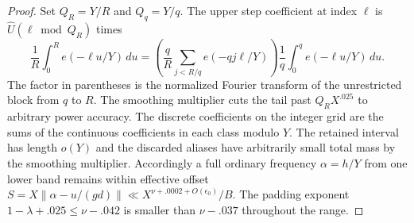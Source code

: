 \documentclass[11pt,a4paper]{article}
\theoremstyle{paperplain}
\numberwithin{equation}{section}
\begin{document}
\begin{proof}
Set $Q_R=Y/R$ and $Q_q=Y/q$. The upper step coefficient at
index $\ell$ is $\widehat U(\ell\bmod Q_R)$ times
\begin{equation}\label{eq:near-balanced-sinc-block}
 \frac1R\int_0^R e(-\ell u/Y)\,du
   = \left(\frac{q}{R}\sum_{j<R/q}e(-qj\ell/Y)\right)
                    \frac1q\int_0^q e(-\ell u/Y)\,du.
\end{equation}
The factor in parentheses is the normalized Fourier
transform of the unrestricted block from $q$ to $R$.
The smoothing multiplier cuts the tail past $Q_R X^{.025}$
to arbitrary power accuracy. The discrete coefficients on the integer
grid are the sums of the continuous coefficients in each class modulo
$Y$. The retained interval has length $o(Y)$ and the discarded aliases
have arbitrarily small total mass by the smoothing multiplier. Accordingly a full ordinary
frequency $\alpha=h/Y$ from one lower band remains within
effective offset $S=X\|\alpha-u/(gd)\|\ll X^{\nu+.0002+O(\epsilon_0)}/B$.
The padding exponent $1-\lambda+.025\le\nu-.042$ is
smaller than $\nu-.037$ throughout the range.


\end{proof}
\end{document}
